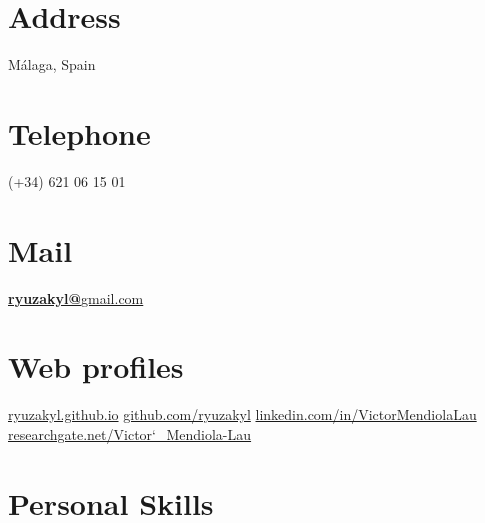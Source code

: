 \documentclass[]{friggeri-cv}
\begin{document}


\begin{aside}
  \section{Address}
    Málaga, Spain
    ~
    ~
    ~
  \section{Telephone}
    (+34) 621 06 15 01
    ~
    ~
    ~
  \section{Mail}
    \href{mailto:ryuzakyl@gmail.com}{\textbf{ryuzakyl@}gmail.com}
	~
	~    
    ~
  \section{Web profiles}
    \href{https://ryuzakyl.github.io}{{\scriptsize ryuzakyl.github.io}}
    \href{https://github.com/ryuzakyl}{{\scriptsize github.com/ryuzakyl}}
    \href{https://www.linkedin.com/in/victormendiolalau}{{\scriptsize linkedin.com/in/VictorMendiolaLau}}
	\href{https://www.researchgate.net/profile/Victor_Mendiola-Lau}{{\scriptsize researchgate.net/Victor\char`_Mendiola-Lau}}
    ~
    ~
    ~
  \section{Personal Skills}
    ~
\end{aside}
\end{document}
